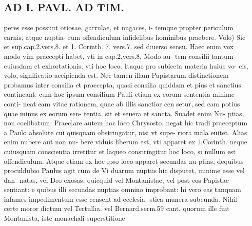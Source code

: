\documentclass{article}
\begin{document}
\begin{pages}
\section*{AD I. PAVL. AD TIM. }
\marginpar{[ p.190 ]}\pstart peres esse possunt otiosae, garrulae, et nugaces, i- temque propter periculum carnis, atque nuptia- rum offendiculum infidelibus hominibus praebere. Volo) Sic et sup.cap.2.vers.8. et 1. Corinth. 7. vers.7. sed diuerso sensu. Haec enim vox modo vim praecepti habet, vti in cap.2.vers.8. Modo au- tem consilii tantum cuiusdam et exhortationis, vti hoc loco. Itaque pro subiecta materia huius vo- cis, volo, significatio accipienda est. Nec tamen illam Papistarum distinctionem probamus inter consilia et praecepta, quasi consilia quiddam et pius et sanctius contineant: cum hoc ipsum consilium Pauli etiam ex eorum sententia minime conti- neat eam vitae rationem, quae ab illis sanctior cen setur, sed eam potius quae minus ex eorum sen- tentia, sit et seuera et sancta. Suadet enim Nu- ptias, non coelibatum. Praeclare autem hoc loco Chrysosto. negat hic tradi praeceptum a Paulo absolute cui quisquam obstringatur, nisi vt supe- riora mala euitet. Alias enim nubere aut non nu- bere viduis liberum est, vti apparet ex 1.Corinth. neque cuiusquam conscientia irretitur et laqueo constringitur hoc loco, si nullum est offendiculum. Atque etiam ex hoc ipso loco apparet secundas nu ptias, dequibus proculdubio Paulus agit cum de Vi duarum nuptiis hic disputet, minime esse vel dan- natas, vel Deo exosas, quicquid vel Montanistae, vel post eos Papistae sentiant: e quibus illi secundas nuptias omnino improbant: hi vero eas tanquam infames impedimentum esse censent ad ecclesia- stica munera subeunda. Nihil certe moror dictum vel Tertullia. vel Bernard.serm.59 cant. quorum ille fuit Montanista, iste monachali superstitione  \pend

\end{pages}
\end{document}
